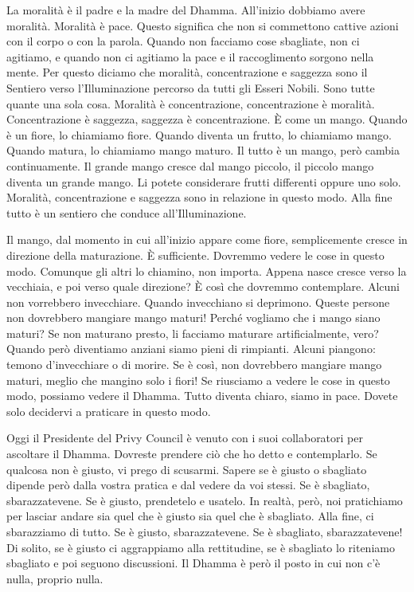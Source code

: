 La moralità è il padre e la madre del Dhamma. All'inizio dobbiamo avere
moralità. Moralità è pace. Questo significa che non si commettono
cattive azioni con il corpo o con la parola. Quando non facciamo cose
sbagliate, non ci agitiamo, e quando non ci agitiamo la pace e il
raccoglimento sorgono nella mente. Per questo diciamo che moralità,
concentrazione e saggezza sono il Sentiero verso l'Illuminazione
percorso da tutti gli Esseri Nobili. Sono tutte quante una sola cosa.
Moralità è concentrazione, concentrazione è moralità. Concentrazione è
saggezza, saggezza è concentrazione. È come un mango. Quando è un fiore,
lo chiamiamo fiore. Quando diventa un frutto, lo chiamiamo mango. Quando
matura, lo chiamiamo mango maturo. Il tutto è un mango, però cambia
continuamente. Il grande mango cresce dal mango piccolo, il piccolo
mango diventa un grande mango. Li potete considerare frutti differenti
oppure uno solo. Moralità, concentrazione e saggezza sono in relazione
in questo modo. Alla fine tutto è un sentiero che conduce
all'Illuminazione.

Il mango, dal momento in cui all'inizio appare come fiore, semplicemente
cresce in direzione della maturazione. È sufficiente. Dovremmo vedere le
cose in questo modo. Comunque gli altri lo chiamino, non importa. Appena
nasce cresce verso la vecchiaia, e poi verso quale direzione? È così che
dovremmo contemplare. Alcuni non vorrebbero invecchiare. Quando
invecchiano si deprimono. Queste persone non dovrebbero mangiare mango
maturi! Perché vogliamo che i mango siano maturi? Se non maturano
presto, li facciamo maturare artificialmente, vero? Quando però
diventiamo anziani siamo pieni di rimpianti. Alcuni piangono: temono
d'invecchiare o di morire. Se è così, non dovrebbero mangiare mango
maturi, meglio che mangino solo i fiori! Se riusciamo a vedere le cose
in questo modo, possiamo vedere il Dhamma. Tutto diventa chiaro, siamo
in pace. Dovete solo decidervi a praticare in questo modo.

Oggi il Presidente del Privy Council è venuto con i suoi collaboratori
per ascoltare il Dhamma. Dovreste prendere ciò che ho detto e
contemplarlo. Se qualcosa non è giusto, vi prego di scusarmi. Sapere se
è giusto o sbagliato dipende però dalla vostra pratica e dal vedere da
voi stessi. Se è sbagliato, sbarazzatevene. Se è giusto, prendetelo e
usatelo. In realtà, però, noi pratichiamo per lasciar andare sia quel
che è giusto sia quel che è sbagliato. Alla fine, ci sbarazziamo di
tutto. Se è giusto, sbarazzatevene. Se è sbagliato, sbarazzatevene! Di
solito, se è giusto ci aggrappiamo alla rettitudine, se è sbagliato lo
riteniamo sbagliato e poi seguono discussioni. Il Dhamma è però il posto
in cui non c'è nulla, proprio nulla.

